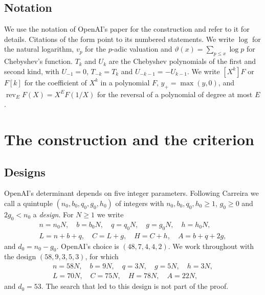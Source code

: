 \documentclass[11pt]{amsart}
\theoremstyle{definition}
\theoremstyle{remark}
\numberwithin{equation}{section}
\begin{document}
\subsection{Notation}
We use the notation of OpenAI's paper \cite{OpenAI2026} for the construction and refer to it for details.
Citations of the form \cite[Prop.~2.1]{OpenAI2026} point to its numbered statements. We write $\log$ for
the natural logarithm, $v_p$ for the $p$-adic valuation and $\vartheta(x)=\sum_{p\le x}\log p$ for
Chebyshev's function. $T_k$ and $U_k$ are the Chebyshev polynomials of the first and second kind, with
$U_{-1}=0$, $T_{-k}=T_k$ and $U_{-k-1}=-U_{k-1}$. We write $[X^k]F$ or $F[k]$ for the coefficient of $X^k$
in a polynomial $F$, $y_+=\max(y,0)$, and $\operatorname{rev}_EF(X)=X^EF(1/X)$ for the reversal of a
polynomial of degree at most $E$.

\section{The construction and the criterion}\label{sec:overview}

\subsection{Designs}
OpenAI's determinant depends on five integer parameters. Following Carreira \cite{Carreira2026} we call a
quintuple $(n_0,b_0,q_0,g_0,h_0)$ of integers with $n_0,b_0,q_0,h_0\ge1$, $g_0\ge0$ and $2g_0<n_0$ a
\emph{design}. For $N\ge1$ we write
\begin{gather*}
 n=n_0N,\quad b=b_0N,\quad q=q_0N,\quad g=g_0N,\quad h=h_0N,\\
 L=n+b+q,\quad C=L+g,\quad H=C+h,\quad A=b+q+2g ,
\end{gather*}
and $d_0=n_0-g_0$. OpenAI's choice is $(48,7,4,4,2)$. We work throughout with the design $(58,9,3,5,3)$,
for which
\begin{gather*}
 n=58N,\quad b=9N,\quad q=3N,\quad g=5N,\quad h=3N,\\
 L=70N,\quad C=75N,\quad H=78N,\quad A=22N,
\end{gather*}
and $d_0=53$. The search that led to this design is not part of the proof.
\end{document}
